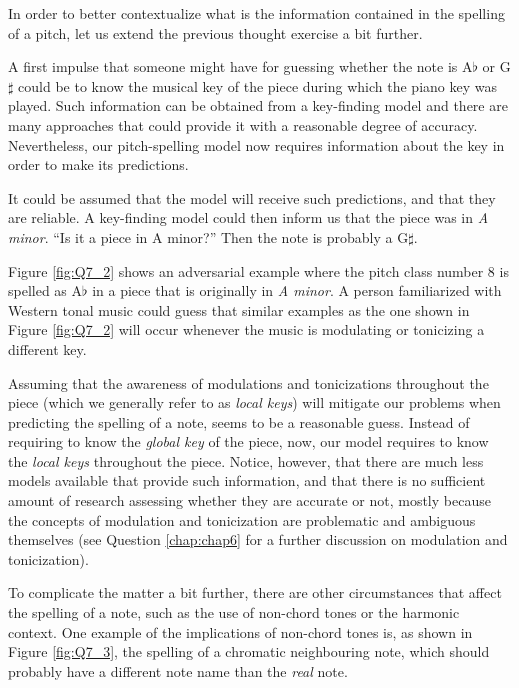 In order to better contextualize what is the information contained in the spelling of a pitch, let us extend the previous thought exercise a bit further. 

A first impulse that someone might have for guessing whether the note is A$\flat$ or G$\sharp$ could be to know the musical key of the piece during which the piano key was played. Such information can be obtained from a key-finding model and there are many approaches that could provide it with a reasonable degree of accuracy. Nevertheless, our pitch-spelling model now requires information about the key in order to make its predictions. 

It could be assumed that the model will receive such predictions, and that they are reliable. A key-finding model could then inform us that the piece was in \emph{A minor}. ``Is it a piece in A minor?'' Then the note is probably a G$\sharp$.


Figure \ref{fig:Q7_2} shows an adversarial example where the pitch class number 8 is spelled as A$\flat$ in a piece that is originally in \emph{A minor}. A person familiarized with Western tonal music could guess that similar examples as the one shown in Figure \ref{fig:Q7_2} will occur whenever the music is modulating or tonicizing a different key.

Assuming that the awareness of modulations and tonicizations throughout the piece (which we generally refer to as \emph{local keys}) will mitigate our problems when predicting the spelling of a note, seems to be a reasonable guess. Instead of requiring to know the \emph{global key} of the piece, now, our model requires to know the \emph{local keys} throughout the piece. Notice, however, that there are much less models available that provide such information, and that there is no sufficient amount of research assessing whether they are accurate or not, mostly because the concepts of modulation and tonicization are problematic and ambiguous themselves (see Question \ref{chap:chap6} for a further discussion on modulation and tonicization). 

To complicate the matter a bit further, there are other circumstances that affect the spelling of a note, such as the use of non-chord tones or the harmonic context. One example of the implications of non-chord tones is, as shown in Figure \ref{fig:Q7_3}, the spelling of a chromatic neighbouring note, which should probably have a different note name than the \emph{real} note.

